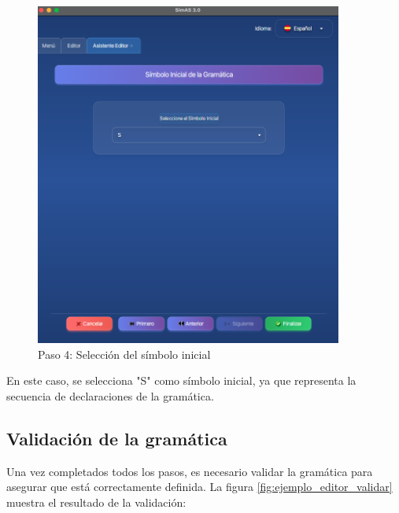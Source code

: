 \needspace{8cm}
\begin{figure}[H]
    \centering
    \includegraphics[width=0.9\textwidth]{figuras/ejemplo_practico/editor_paso4.png}
    \caption{Paso 4: Selección del símbolo inicial}
    \label{fig:ejemplo_editor_paso4}
\end{figure}

En este caso, se selecciona \string"S\string" como símbolo inicial, ya que representa la secuencia de declaraciones de la gramática.

\subsection{Validación de la gramática}

Una vez completados todos los pasos, es necesario validar la gramática para asegurar que está correctamente definida. La figura \ref{fig:ejemplo_editor_validar} muestra el resultado de la validación:

